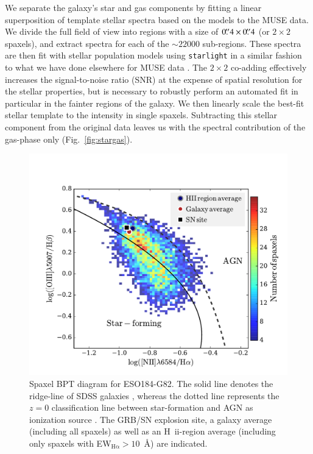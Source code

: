 \documentclass[traditabstract, referee]{aa}
\newcommand{\farc}{\hbox{$.\!\!^{\prime\prime}$}}
\newcommand{\hii}{\mbox{H~{\sc ii}}}
\begin{document}
We separate the galaxy's star and gas components by fitting a linear superposition of template stellar spectra based on the \citet{2003MNRAS.344.1000B} models to the MUSE data. We divide the full field of view into regions with a size of $0\farc{4}\times0\farc{4}$ (or $2 \times 2$ spaxels), and extract spectra for each of the $\sim22000$ sub-regions. These spectra are then fit with stellar population models using \texttt{starlight} \citep{2005MNRAS.358..363C, 2009RMxAC..35..127C} in a similar fashion to what we have done elsewhere for MUSE data \citep{2016MNRAS.455.4087G, 2016arXiv160703446K, 2016arXiv160900013P}. The $2\times2$ co-adding effectively increases the signal-to-noise ratio (SNR) at the expense of spatial resolution for the stellar properties, but is necessary to robustly perform an automated fit in particular in the fainter regions of the galaxy. We then linearly scale the best-fit stellar template to the intensity in single spaxels. Subtracting this stellar component from the original data leaves us with the spectral contribution of the gas-phase only (Fig.~\ref{fig:stargas}).

\begin{figure}
\begin{center}
  \includegraphics[width=0.99\linewidth]{Figs/MUSE_SN1998bw_BPT.pdf}
\caption{Spaxel BPT diagram for ESO184-G82. The solid line denotes the ridge-line of SDSS galaxies \citep{2008MNRAS.385..769B}, whereas the dotted line represents the $z=0$ classification line between star-formation and AGN as ionization source \citep{2013ApJ...774..100K}. The GRB/SN explosion site, a galaxy average (including all spaxels) as well as an \hii-region average (including only spaxels with EW$_{\mathrm{H\alpha}}>10$~\AA) are indicated.}
\label{fig:BPT}
\end{center}
\end{figure}
\end{document}
